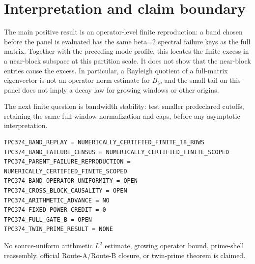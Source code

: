 \documentclass[10pt]{article}
\begin{document}
\section{Interpretation and claim boundary}

The main positive result is an operator-level finite reproduction: a band
chosen before the panel is evaluated has the same beta=2 spectral failure
keys as the full matrix.  Together with the preceding mode profile, this
locates the finite excess in a near-block subspace at this partition scale.
It does not show that the near-block entries cause the excess.  In
particular, a Rayleigh quotient of a full-matrix eigenvector is not an
operator-norm estimate for \(B_3\), and the small tail on this panel does not
imply a decay law for growing windows or other origins.

The next finite question is bandwidth stability: test smaller predeclared
cutoffs, retaining the same full-window normalization and caps, before any
asymptotic interpretation.

\begin{verbatim}
TPC374_BAND_REPLAY = NUMERICALLY_CERTIFIED_FINITE_18_ROWS
TPC374_BAND_FAILURE_CENSUS = NUMERICALLY_CERTIFIED_FINITE_SCOPED
TPC374_PARENT_FAILURE_REPRODUCTION = NUMERICALLY_CERTIFIED_FINITE_SCOPED
TPC374_BAND_OPERATOR_UNIFORMITY = OPEN
TPC374_CROSS_BLOCK_CAUSALITY = OPEN
TPC374_ARITHMETIC_ADVANCE = NO
TPC374_FIXED_POWER_CREDIT = 0
TPC374_FULL_GATE_B = OPEN
TPC374_TWIN_PRIME_RESULT = NONE
\end{verbatim}

No source-uniform arithmetic $L^2$ estimate, growing operator bound,
prime-shell reassembly, official Route-A/Route-B closure, or twin-prime
theorem is claimed.
\end{document}
